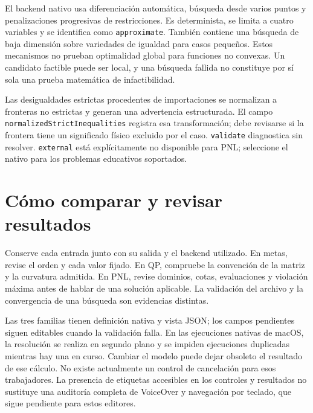 El backend nativo usa diferenciación automática, búsqueda desde varios puntos
y penalizaciones progresivas de restricciones. Es determinista, se limita a
cuatro variables y se identifica como \texttt{approximate}. También contiene
una búsqueda de baja dimensión sobre variedades de igualdad para casos
pequeños. Estos mecanismos no prueban optimalidad global para funciones no
convexas. Un candidato factible puede ser local, y una búsqueda fallida no
constituye por sí sola una prueba matemática de infactibilidad.

Las desigualdades estrictas procedentes de importaciones se normalizan a
fronteras no estrictas y generan una advertencia estructurada. El campo
\texttt{normalizedStrictInequalities} registra esa transformación; debe
revisarse si la frontera tiene un significado físico excluido por el caso.
\texttt{validate} diagnostica sin resolver. \texttt{external} está
explícitamente no disponible para PNL; seleccione el nativo para los problemas
educativos soportados.

\section{Cómo comparar y revisar resultados}
Conserve cada entrada junto con su salida y el backend utilizado. En metas,
revise el orden y cada valor fijado. En QP, compruebe la convención de la matriz
y la curvatura admitida. En PNL, revise dominios, cotas, evaluaciones y
violación máxima antes de hablar de una solución aplicable. La validación del
archivo y la convergencia de una búsqueda son evidencias distintas.

Las tres familias tienen definición nativa y vista JSON; los campos pendientes
siguen editables cuando la validación falla. En las ejecuciones nativas de
macOS, la resolución se realiza en segundo plano y se impiden ejecuciones
duplicadas mientras hay una en curso. Cambiar el modelo puede dejar
obsoleto el resultado de ese cálculo. No existe actualmente un control de
cancelación para esos trabajadores. La presencia de etiquetas accesibles en
los controles y resultados no sustituye una auditoría completa de VoiceOver y
navegación por teclado, que sigue pendiente para estos editores.


